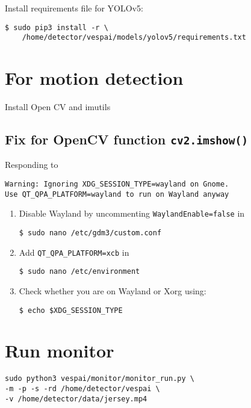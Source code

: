 \documentclass[12pt, a4paper, oneside]{article}
\begin{document}
Install requirements file for YOLOv5:
\begin{verbatim}
$ sudo pip3 install -r \
	/home/detector/vespai/models/yolov5/requirements.txt
\end{verbatim}


\section{For motion detection}
Install Open CV and imutils


\subsection{Fix for OpenCV function \texttt{cv2.imshow()}}

Responding to
\begin{verbatim}
Warning: Ignoring XDG_SESSION_TYPE=wayland on Gnome.
Use QT_QPA_PLATFORM=wayland to run on Wayland anyway
\end{verbatim}

\begin{enumerate}

\item
Disable Wayland by uncommenting \texttt{WaylandEnable=false} in
\begin{verbatim}
$ sudo nano /etc/gdm3/custom.conf
\end{verbatim}

\item
Add \texttt{QT\_QPA\_PLATFORM=xcb} in
\begin{verbatim}
$ sudo nano /etc/environment
\end{verbatim}

\item
Check whether you are on Wayland or Xorg using:
\begin{verbatim}
$ echo $XDG_SESSION_TYPE
\end{verbatim}
\end{enumerate}


\section{Run monitor}
\begin{verbatim}
sudo python3 vespai/monitor/monitor_run.py \
-m -p -s -rd /home/detector/vespai \
-v /home/detector/data/jersey.mp4
\end{verbatim}


\end{document}
